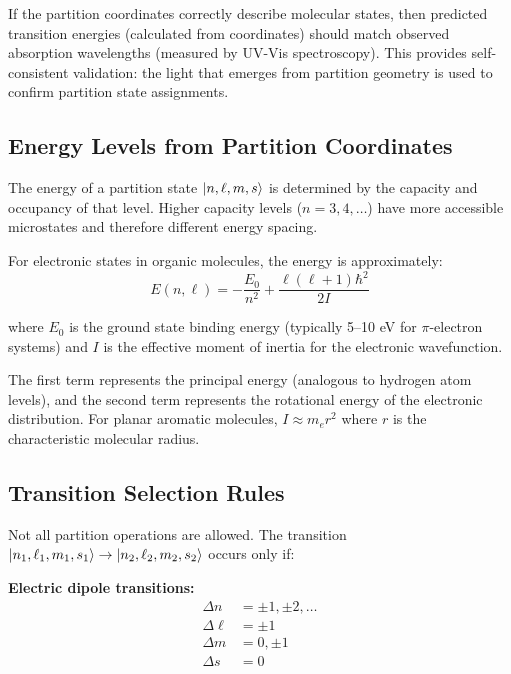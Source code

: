 \documentclass[twocolumn,superscriptaddress,prb,10pt]{revtex4-2}
\begin{document}
If the partition coordinates correctly describe molecular states, then predicted transition energies (calculated from coordinates) should match observed absorption wavelengths (measured by UV-Vis spectroscopy). This provides self-consistent validation: the light that emerges from partition geometry is used to confirm partition state assignments.

\subsection{Energy Levels from Partition Coordinates}

The energy of a partition state $\ket{n,\ell,m,s}$ is determined by the capacity and occupancy of that level. Higher capacity levels ($n = 3, 4, \ldots$) have more accessible microstates and therefore different energy spacing.

For electronic states in organic molecules, the energy is approximately:
\begin{equation}
E(n,\ell) = -\frac{E_0}{n^2} + \frac{\ell(\ell+1)\hbar^2}{2I}
\label{eq:energy_level}
\end{equation}

where $E_0$ is the ground state binding energy (typically 5--10 eV for $\pi$-electron systems) and $I$ is the effective moment of inertia for the electronic wavefunction.

The first term represents the principal energy (analogous to hydrogen atom levels), and the second term represents the rotational energy of the electronic distribution. For planar aromatic molecules, $I \approx m_e r^2$ where $r$ is the characteristic molecular radius.

\subsection{Transition Selection Rules}

Not all partition operations are allowed. The transition $\ket{n_1,\ell_1,m_1,s_1} \to \ket{n_2,\ell_2,m_2,s_2}$ occurs only if:

\textbf{Electric dipole transitions:}
\begin{align}
\Delta n &= \pm 1, \pm 2, \ldots \label{eq:rule_n} \\
\Delta \ell &= \pm 1 \label{eq:rule_ell} \\
\Delta m &= 0, \pm 1 \label{eq:rule_m} \\
\Delta s &= 0 \label{eq:rule_s}
\end{align}
\end{document}
